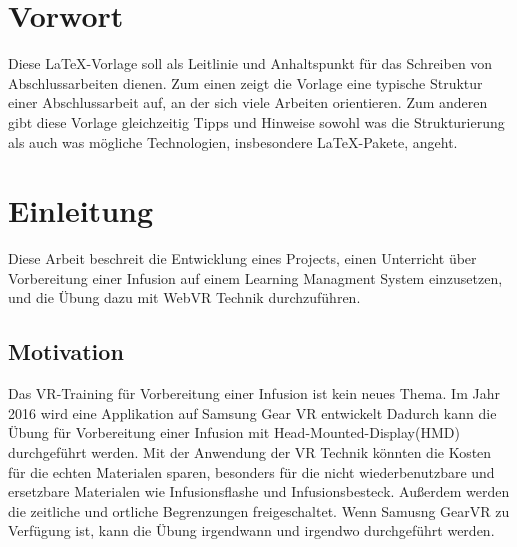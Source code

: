 \chapter*{Vorwort}

Diese \LaTeX-Vorlage soll als Leitlinie und Anhaltspunkt für das Schreiben von Abschlussarbeiten dienen. Zum einen zeigt die Vorlage eine typische Struktur einer Abschlussarbeit auf, an der sich viele Arbeiten orientieren. Zum anderen gibt diese Vorlage gleichzeitig Tipps und Hinweise sowohl was die Strukturierung als auch was mögliche Technologien, insbesondere \LaTeX-Pakete, angeht.

\chapter{Einleitung}

Diese Arbeit beschreit die Entwicklung eines Projects, einen Unterricht über Vorbereitung einer Infusion auf einem Learning Managment System  einzusetzen, und die Übung dazu mit WebVR Technik durchzuführen.

\section{Motivation}

Das VR-Training für Vorbereitung einer Infusion ist kein neues Thema. Im Jahr 2016 wird eine Applikation auf Samsung Gear VR entwickelt\citep{26}
Dadurch kann die Übung für Vorbereitung einer Infusion mit Head-Mounted-Display(HMD) durchgeführt werden. Mit der Anwendung der VR Technik könnten die Kosten für die echten Materialen sparen, besonders für die nicht wiederbenutzbare und ersetzbare Materialen wie Infusionsflashe und Infusionsbesteck. Außerdem werden die zeitliche und ortliche Begrenzungen freigeschaltet. Wenn Samusng GearVR zu Verfügung ist, kann die Übung irgendwann und irgendwo durchgeführt werden.

